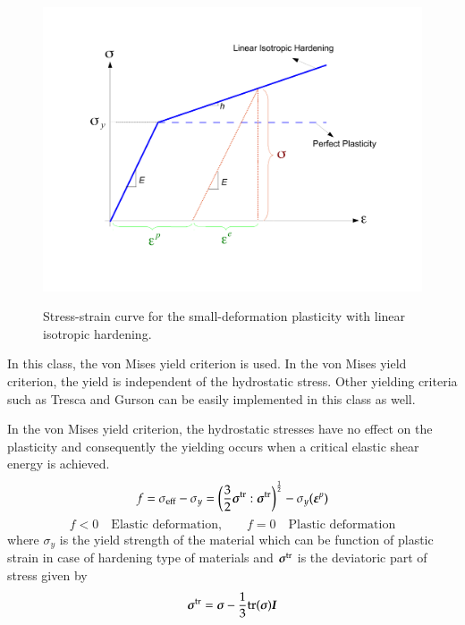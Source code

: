 \begin{figure}[htp]
  \centering
  {\includegraphics[scale=0.4, clip]{figures/isotropic_hardening_plasticity.pdf}}
  \caption{
    Stress-strain curve for the small-deformation plasticity with linear isotropic hardening.
  }
  \label{fig:smm:cl:Lin-strain-hard}
\end{figure}

\noindent In this class, the von Mises yield criterion is used. In the von Mises yield criterion, the yield is independent of the hydrostatic stress. Other yielding criteria such as Tresca and Gurson can be easily implemented in this class as well.

In the von Mises yield criterion, the hydrostatic stresses have no effect on the plasticity and consequently the yielding occurs when a critical elastic shear energy is achieved.
\begin{equation} \label{eqn:smm:constitutive:von Mises}
  f = \sigma_{{\mathrm{eff}}} - \sigma_y = \left(\frac{3}{2} {\boldsymbol{\sigma}}^{{\mathrm{tr}}} : {\boldsymbol{\sigma}}^{{\mathrm{tr}}}\right)^\frac{1}{2}-\sigma_y (\boldsymbol{\varepsilon}^p)
\end{equation}
\begin{equation} \label{eqn:smm:constitutive:yielding}
  f < 0 \quad \textrm{Elastic deformation,} \qquad f = 0 \quad  \textrm{Plastic deformation}
\end{equation}
where $\sigma_y$ is the yield strength of the material which can be function of plastic strain in case of hardening type of materials and ${\boldsymbol{\sigma}}^{{\mathrm{tr}}}$ is the deviatoric part of stress given by
\begin{equation} \label{eqn:smm:constitutive:deviatoric stress}
  {\ensuremath{\boldsymbol{\sigma}}}^{{\mathrm{tr}}}=\boldsymbol{\sigma} - \frac{1}{3} \mathrm{tr}(\boldsymbol{\sigma}) \boldsymbol{I}
\end{equation}

